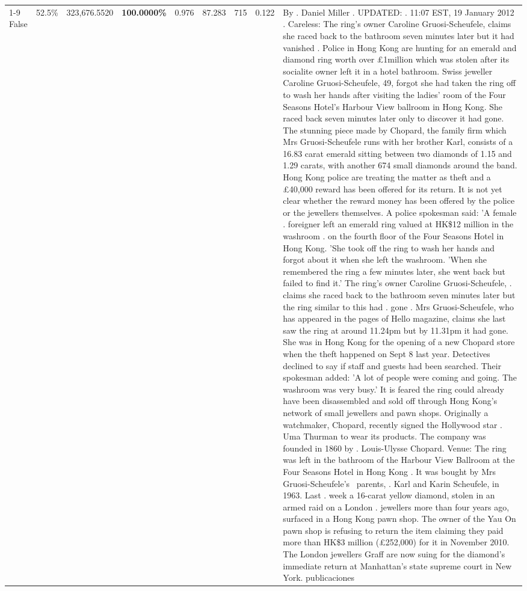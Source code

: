 \begin{table}[H]
\begin{tabular}{lllrlllll}
\cline{1-9} \cline{2-9}
False & 52.5\% & 323,676.5520 & \bfseries \color{red} 100.0000\% & 0.976 & 87.283 & 715 & 0.122 & By . Daniel Miller . UPDATED: . 11:07 EST, 19 January 2012 . Careless: The ring's owner Caroline Gruosi-Scheufele, claims she raced back to the bathroom seven minutes later but it had vanished . Police in Hong Kong are hunting for an emerald and diamond ring worth over £1million which was stolen after its socialite owner left it in a hotel bathroom. Swiss jeweller Caroline Gruosi-Scheufele, 49, forgot she had taken the ring off to wash her hands after visiting the ladies' room of the Four Seasons Hotel's Harbour View ballroom in Hong Kong. She raced back seven minutes later only to discover it had gone. The stunning piece made by Chopard, the family firm which Mrs Gruosi-Scheufele runs with her brother Karl, consists of a 16.83 carat emerald sitting between two diamonds of 1.15 and 1.29 carats, with another 674 small diamonds around the band. Hong Kong police are treating the matter as theft and a £40,000 reward has been offered for its return. It is not yet clear whether the reward money has been offered by the police or the jewellers themselves. A police spokesman said: 'A female . foreigner left an emerald ring valued at HK\$12 million in the washroom . on the fourth floor of the Four Seasons Hotel in Hong Kong. 'She took off the ring to wash her hands and forgot about it when she left the washroom. 'When she remembered the ring a few minutes later, she went back but failed to find it.' The ring's owner Caroline Gruosi-Scheufele, . claims she raced back to the bathroom seven minutes later but the ring similar to this had . gone . Mrs Gruosi-Scheufele, who has appeared in the pages of Hello magazine, claims she last saw the ring at around 11.24pm but by 11.31pm it had gone. She was in Hong Kong for the opening of a new Chopard store when the theft happened on Sept 8 last year. Detectives declined to say if staff and guests had been searched. Their spokesman added: 'A lot of people were coming and going. The washroom was very busy.' It is feared the ring could already have been disassembled and sold off through Hong Kong's network of small jewellers and pawn shops. Originally a watchmaker, Chopard, recently signed the Hollywood star . Uma Thurman to wear its products. The company was founded in 1860 by . Louis-Ulysse Chopard. Venue: The ring was left in the bathroom of the Harbour View Ballroom at the Four Seasons Hotel in Hong Kong . It was bought by Mrs Gruosi-Scheufele's  parents, . Karl and Karin Scheufele, in 1963. Last . week a 16-carat yellow diamond, stolen in an armed raid on a London . jewellers more than four years ago, surfaced in a Hong Kong pawn shop. The owner of the Yau On pawn shop is refusing to return the item claiming they paid more than HK\$3 million (£252,000) for it in November 2010. The London jewellers Graff are now suing for the diamond’s immediate return at Manhattan’s state supreme court in New York. publicaciones \\

\end{tabular}
\end{table}
